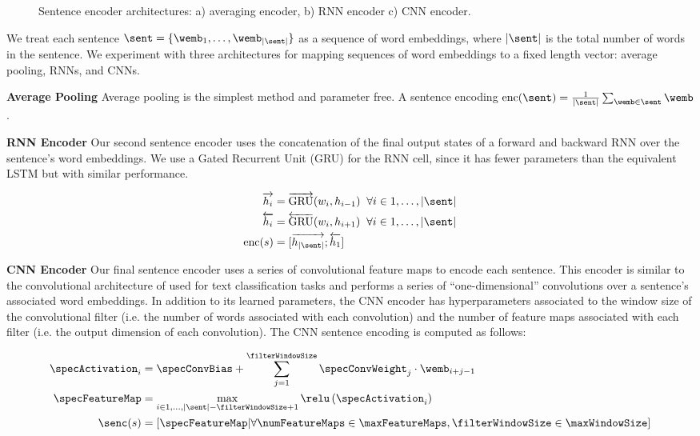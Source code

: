 \begin{figure}
    \caption{Sentence encoder architectures: a) averaging encoder, b) RNN encoder c) CNN encoder.}
    \label{fig:encoders}
\end{figure}



We treat each sentence $\sent = \{\wemb_1, \ldots, \wemb_{|\sent|}\}$ 
as a sequence of word embeddings, where $|\sent|$ is the total number of words
in the sentence. We experiment with three architectures for mapping sequences
of word embeddings to a fixed length vector: average pooling, RNNs, and CNNs.

\textbf{Average Pooling} Average pooling is the simplest method and parameter
free. A sentence encoding $\operatorname{enc}(\sent) = 
\frac{1}{|\sent|} \sum_{\wemb \in \sent} \wemb$.

\textbf{RNN Encoder} Our second sentence encoder uses the concatenation of the
final output states of a forward and backward RNN over the sentence's word
embeddings. We use a Gated Recurrent Unit (GRU) \cite{cho} for the RNN cell,
since it has fewer parameters than the equivalent LSTM but with similar 
performance.

\begin{align} 
    \overrightarrow{h_i} &= \overrightarrow{\operatorname{GRU}}(w_i, h_{i-1}) \;\; \forall i \in 1, \ldots, |\sent| \\
    \overleftarrow{h_i} &= \overleftarrow{\operatorname{GRU}}(w_i, h_{i+1})  \;\; \forall i \in 1, \ldots, |\sent| \\
    \operatorname{enc}(s) &= [\overrightarrow{h_{|\sent|}} ; \overleftarrow{h_1} ] 
\end{align}

\textbf{CNN Encoder} Our final sentence encoder uses a series of 
convolutional feature maps to encode each sentence. This encoder is similar
to the convolutional architecture of \cite{kim} used for text classification
tasks and performs a series of ``one-dimensional'' convolutions over 
a sentence's associated word embeddings. 
In addition to its learned parameters, the CNN encoder has hyperparameters
associated to the window size of the convolutional filter 
(i.e. the number of words associated with each convolution) and the number of 
feature maps associated with each filter (i.e. the output dimension of each 
convolution). The CNN sentence encoding is computed as follows:

\begin{align}
 \specActivation_i &= \specConvBias 
    + \sum^\filterWindowSize_{j=1} \specConvWeight_j \cdot \wemb_{i + j -1}\\
  \specFeatureMap &= \max_{i\in 1,\dots, |\sent| - \filterWindowSize + 1} 
                      \relu\left(\specActivation_i\right) \\
                      \senc(s) &= \left[\specFeatureMap| \forall \numFeatureMaps \in \maxFeatureMaps, \filterWindowSize \in \maxWindowSize \right]
\end{align}


